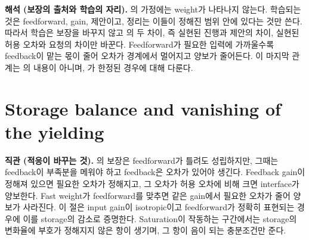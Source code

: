 \documentclass[11pt]{article}\usepackage[margin=1in]{geometry}\usepackage{amsmath,amssymb,amsthm,mathtools}\usepackage{graphicx}\graphicspath{{figures/}{../figures/}{figs/}{./}}\usepackage{enumitem}\usepackage{hyperref}\usepackage{cleveref}\usepackage{tikz}\usetikzlibrary{arrows.meta,positioning,calc,shapes.geometric}\usepackage{float}\usepackage[most]{tcolorbox}\usepackage{kotex}\usepackage{booktabs}\emergencystretch=1.6em\tolerance=2000 \crefname{assumption}{Assumption}{Assumptions}\Crefname{assumption}{Assumption}{Assumptions}\crefname{definition}{Definition}{Definitions}\Crefname{definition}{Definition}{Definitions}\crefname{proposition}{Proposition}{Propositions}\Crefname{proposition}{Proposition}{Propositions}\crefname{fact}{Fact}{Facts}\Crefname{fact}{Fact}{Facts} \newtheorem{assumption}{Assumption}\newtheorem{definition}{Definition}\newtheorem{lemma}{Lemma}\newtheorem{proposition}{Proposition}\newtheorem{theorem}{Theorem}\newtheorem{corollary}{Corollary}\newtheorem{fact}{Fact}\theoremstyle{remark}\newtheorem{remark}{Remark} \newcommand{\R}{\mathbb{R}}\newcommand{\U}{\mathcal U}
\begin{document}
\textbf{해석 (보장의 출처와 학습의 자리).} 의 가정에는 weight가 나타나지 않는다. 학습되는 것은 feedforward, gain, 제안이고, 정리는 이들이 정해진 범위 안에 있다는 것만 쓴다. 따라서 학습은 보장을 바꾸지 않고 의 두 차이, 즉 실현된 진행과 제안의 차이, 실현된 허용 오차와 요청의 차이만 바꾼다. Feedforward가 필요한 입력에 가까울수록 feedback이 맡는 몫이 줄어 오차가 경계에서 멀어지고 양보가 줄어든다. 이 마지막 관계는 의 내용이 아니며, 가 한정된 경우에 대해 다룬다.

\section{Storage balance and vanishing of the yielding}
\label{sec:storage}

\textbf{직관 (적응이 바꾸는 것).} 의 보장은 feedforward가 틀려도 성립하지만, 그때는 feedback이 부족분을 메워야 하고 feedback은 오차가 있어야 생긴다. Feedback gain이 정해져 있으면 필요한 오차가 정해지고, 그 오차가 허용 오차에 비해 크면 interface가 양보한다. Fast weight가 feedforward를 맞추면 같은 gain에서 필요한 오차가 줄어 양보가 사라진다. 이 절은 input gain이 isotropic이고 feedforward가 정확히 표현되는 경우에 이를 storage의 감소로 증명한다. Saturation이 작동하는 구간에서는 storage의 변화율에 부호가 정해지지 않은 항이 생기며, 그 항이 음이 되는 충분조건만 준다.
\end{document}

